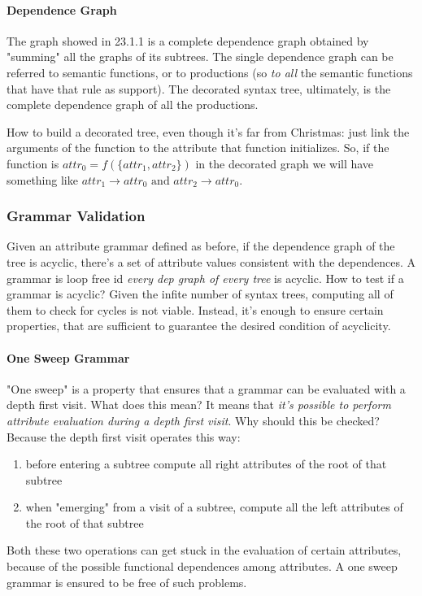 				\paragraph{Dependence Graph}
					The graph showed in 23.1.1 is a complete dependence graph obtained by "summing" all the graphs of its subtrees. The single dependence graph can be 
					referred to semantic functions, or to productions (so \emph{to all} the semantic functions that have that rule as support). The decorated syntax 
					tree, ultimately, is the complete dependence graph of all the productions.

					How to build a decorated tree, even though it's far from Christmas: just link the arguments of the function to the attribute that function 
					initializes. So, if the function is $attr_0 = f(\{attr_1, attr_2\})$ in the decorated graph we will have something like 
					$attr_1 \rightarrow attr_0 \text{ and } attr_2 \rightarrow attr_0$.
			
			\subsubsection{Grammar Validation}
				Given an attribute grammar defined as before, if the dependence graph of the tree is acyclic, there's a set of attribute values consistent with the 
				dependences. A grammar is loop free id \emph{every dep graph of every tree} is acyclic. How to test if a grammar is acyclic? Given the infite number 
				of syntax trees, computing all of them to check for cycles is not viable. Instead, it's enough to ensure certain properties, that are sufficient to 
				guarantee the desired condition of acyclicity.
				
				\paragraph{One Sweep Grammar}
					"One sweep" is a property that ensures that a grammar can be evaluated with a depth first visit. What does this mean? It means that 
					\emph{it's possible to perform attribute evaluation during a depth first visit}. Why should this be checked? Because the depth first visit 
					operates this way:
					\begin{enumerate}
						\item before entering a subtree compute all right attributes of the root of that subtree
						\item when "emerging" from a visit of a subtree, compute all the left attributes of the root of that subtree
					\end{enumerate} 
					Both these two operations can get stuck in the evaluation of certain attributes, because of the possible functional dependences among attributes. 
					A one sweep grammar is ensured to be free of such problems.

